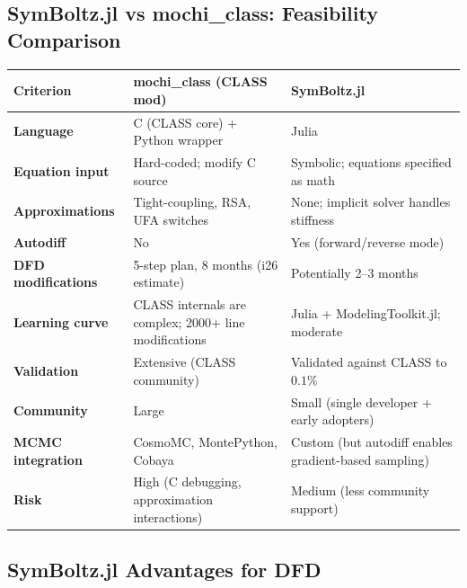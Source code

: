 \documentclass[11pt,a4paper]{article}
\begin{document}
\subsection{SymBoltz.jl vs mochi\_class: Feasibility Comparison}

\begin{center}
\begin{longtable}{p{4cm}p{5cm}p{5cm}}
\toprule
\textbf{Criterion} & \textbf{mochi\_class (CLASS mod)} & \textbf{SymBoltz.jl} \\
\midrule
\endfirsthead
\textbf{Language} & C (CLASS core) + Python wrapper & Julia \\
\textbf{Equation input} & Hard-coded; modify C source & Symbolic; equations specified as math \\
\textbf{Approximations} & Tight-coupling, RSA, UFA switches & None; implicit solver handles stiffness \\
\textbf{Autodiff} & No & Yes (forward/reverse mode) \\
\textbf{DFD modifications} & 5-step plan, 8 months (i26 estimate) & Potentially 2--3 months \\
\textbf{Learning curve} & CLASS internals are complex; 2000+ line modifications & Julia + ModelingToolkit.jl; moderate \\
\textbf{Validation} & Extensive (CLASS community) & Validated against CLASS to $0.1\%$ \\
\textbf{Community} & Large & Small (single developer + early adopters) \\
\textbf{MCMC integration} & CosmoMC, MontePython, Cobaya & Custom (but autodiff enables gradient-based sampling) \\
\textbf{Risk} & High (C debugging, approximation interactions) & Medium (less community support) \\
\bottomrule
\end{longtable}
\end{center}

\subsection{SymBoltz.jl Advantages for DFD}
\end{document}
